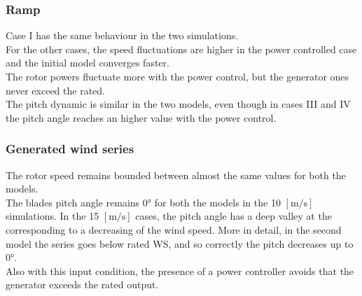 \subsubsection{Ramp}
Case I has the same behaviour in the two simulations.\\
For the other cases, the speed fluctuations are higher in the power controlled case and the initial model converges faster.\\
The rotor powers fluctuate more with the power control, but the generator ones never exceed the rated. \\
The pitch dynamic is similar in the two models, even though in cases III and IV the pitch angle reaches an higher value with the power control.
\subsubsection{Generated wind series}
The rotor speed remains bounded between almost the same values for both the models.\\
The blades pitch angle remains 0$\si{\degree}$ for both the models in the 10 $\left[\si{\meter\per\second}\right]$ simulations. In the 15 $\left[\si{\meter\per\second}\right]$ cases, the pitch angle has a deep valley at the corresponding to a decreasing of the wind speed. More in detail, in the second model the series goes below rated \acrshort{WS}, and so correctly the pitch decreases up to  0$\si{\degree}$.\\
Also with this input condition, the presence of a power controller avoids that the generator exceeds the rated output.